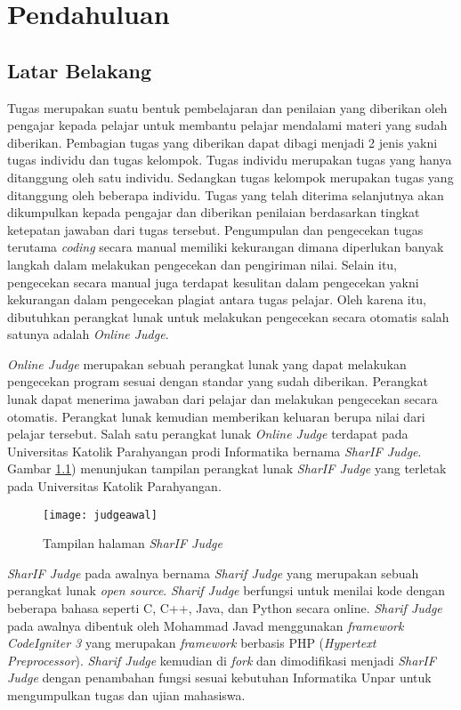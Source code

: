 \chapter{Pendahuluan}
\label{chap:intro}
   
\section{Latar Belakang}
\label{sec:label}

Tugas merupakan suatu bentuk pembelajaran dan penilaian yang diberikan oleh pengajar kepada pelajar untuk membantu pelajar mendalami materi yang sudah diberikan\cite{prihatini:16:plagiarisme}. Pembagian tugas yang diberikan dapat dibagi menjadi 2 jenis yakni tugas individu dan tugas kelompok. Tugas individu merupakan tugas yang hanya ditanggung oleh satu individu. Sedangkan tugas kelompok merupakan tugas yang ditanggung oleh beberapa individu. Tugas yang telah diterima selanjutnya akan dikumpulkan kepada pengajar dan diberikan penilaian berdasarkan tingkat ketepatan jawaban dari tugas tersebut. Pengumpulan dan pengecekan tugas terutama \textit{coding} secara manual memiliki kekurangan dimana diperlukan banyak langkah dalam melakukan pengecekan dan pengiriman nilai. Selain itu, pengecekan secara manual juga terdapat kesulitan dalam pengecekan yakni kekurangan dalam pengecekan plagiat antara tugas pelajar. Oleh karena itu, dibutuhkan perangkat lunak untuk melakukan pengecekan secara otomatis salah satunya adalah \textit{Online Judge}.

\textit{Online Judge} merupakan sebuah perangkat lunak yang dapat melakukan pengecekan program sesuai dengan standar yang sudah diberikan. Perangkat lunak dapat menerima jawaban dari pelajar dan melakukan pengecekan secara otomatis. Perangkat lunak kemudian memberikan keluaran berupa nilai dari pelajar tersebut\cite{kurnia:01:judge}. Salah satu perangkat lunak \textit{Online Judge} terdapat pada Universitas Katolik Parahyangan prodi Informatika bernama \textit{SharIF Judge}. Gambar \ref{fig:judgeawal}) menunjukan tampilan perangkat lunak \textit{SharIF Judge} yang terletak pada Universitas Katolik Parahyangan.

\begin{figure}[H]
	\centering  
	\texttt{[image: judgeawal]}  
	\caption[Tampilan halaman \textit{SharIF Judge}]{Tampilan halaman \textit{SharIF Judge}} 
	\label{fig:judgeawal} 
\end{figure} 


\textit{SharIF Judge} pada awalnya bernama \textit{Sharif Judge} yang merupakan sebuah perangkat lunak \textit{open source}. \textit{Sharif Judge} berfungsi untuk menilai kode dengan beberapa bahasa seperti C, C++, Java, dan Python secara online. \textit{Sharif Judge} pada awalnya dibentuk oleh Mohammad Javad menggunakan \textit{framework} \textit{CodeIgniter 3} yang merupakan \textit{framework} berbasis PHP (\textit{Hypertext Preprocessor})\cite{sharif:23}. \textit{Sharif Judge} kemudian di \textit{fork} dan dimodifikasi menjadi \textit{SharIF Judge} dengan penambahan fungsi sesuai kebutuhan Informatika Unpar untuk mengumpulkan tugas dan ujian mahasiswa\cite{sharif:23}.

